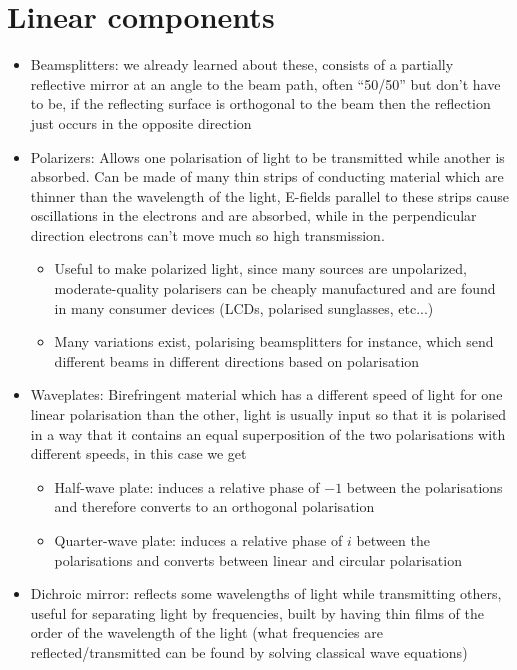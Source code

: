 \documentclass[english]{article}
\begin{document}
\section{Linear components}
\begin{itemize}
\item Beamsplitters: we already learned about these, consists of a partially reflective mirror at an angle to the beam path, often ``50/50'' but don't have to be, if the reflecting surface is orthogonal to the beam then the reflection just occurs in the opposite direction
\item Polarizers: Allows one polarisation of light to be transmitted while another is absorbed. Can be made of many thin strips of conducting material which are thinner than the wavelength of the light, E-fields parallel to these strips cause oscillations in the electrons and are absorbed, while in the perpendicular direction electrons can't move much so high transmission. 
\begin{itemize}
\item Useful to make polarized light, since many sources are unpolarized, moderate-quality polarisers can be cheaply manufactured and are found in many consumer devices (LCDs, polarised sunglasses, etc...)
\item Many variations exist, polarising beamsplitters for instance, which send different beams in different directions based on polarisation
\end{itemize}
\item Waveplates: Birefringent material which has  a different speed of light for one linear polarisation than the other, light is usually input so that it is polarised in a way that it contains an equal superposition of the two polarisations with different speeds, in this case we get
\begin{itemize}
\item Half-wave plate: induces a relative phase of $-1$ between the polarisations and therefore converts to an orthogonal polarisation
\item Quarter-wave plate: induces a relative phase of $i$ between the polarisations and converts between linear and circular polarisation
\end{itemize}
\item Dichroic mirror: reflects some wavelengths of light while transmitting others, useful for separating light by frequencies, built by having thin films of the order of the wavelength of the light (what frequencies are reflected/transmitted can be found by solving classical wave equations)
\end{itemize}
\end{document}
